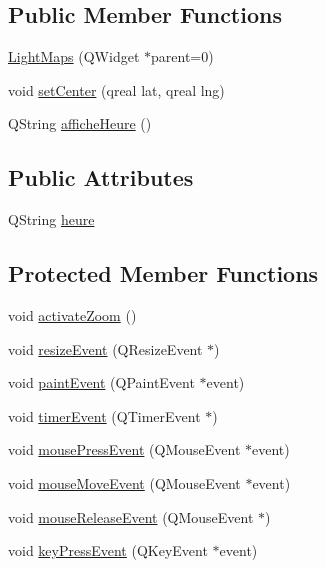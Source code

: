 \subsection*{Public Member Functions}
\begin{DoxyCompactItemize}
\item 
\hyperlink{classLightMaps_ae481a3b0cb8f2bce40e8ae2703aa6cbd}{Light\-Maps} (Q\-Widget $\ast$parent=0)
\item 
void \hyperlink{classLightMaps_a48a673b2f3167a02004ced0b182a8498}{set\-Center} (qreal lat, qreal lng)
\item 
Q\-String \hyperlink{classLightMaps_a4ba4104b6f73f5887227075c38ae8a7c}{affiche\-Heure} ()
\end{DoxyCompactItemize}
\subsection*{Public Attributes}
\begin{DoxyCompactItemize}
\item 
Q\-String \hyperlink{classLightMaps_a3bffc587b77f94dadef10a63ba9b627e}{heure}
\end{DoxyCompactItemize}
\subsection*{Protected Member Functions}
\begin{DoxyCompactItemize}
\item 
void \hyperlink{classLightMaps_a21fa5e0c300553570417ebd907d53d61}{activate\-Zoom} ()
\item 
void \hyperlink{classLightMaps_a1a4eb844187dd9fe819925312a000748}{resize\-Event} (Q\-Resize\-Event $\ast$)
\item 
void \hyperlink{classLightMaps_a5ef253065acd4c9d3ea3015b0fa1e336}{paint\-Event} (Q\-Paint\-Event $\ast$event)
\item 
void \hyperlink{classLightMaps_a89475b3da6e594e645d19ea507e61907}{timer\-Event} (Q\-Timer\-Event $\ast$)
\item 
void \hyperlink{classLightMaps_a12c0b5ff0ef36b7f160dd9184036e346}{mouse\-Press\-Event} (Q\-Mouse\-Event $\ast$event)
\item 
void \hyperlink{classLightMaps_ab55b7bda0a50fd27457ed52118513109}{mouse\-Move\-Event} (Q\-Mouse\-Event $\ast$event)
\item 
void \hyperlink{classLightMaps_a4c66425af6f5ecbca3d0af52e9cee998}{mouse\-Release\-Event} (Q\-Mouse\-Event $\ast$)
\item 
void \hyperlink{classLightMaps_ae6752e8bbc4bd80b4080e6308cb40a99}{key\-Press\-Event} (Q\-Key\-Event $\ast$event)
\end{DoxyCompactItemize}
